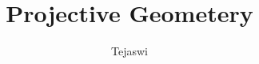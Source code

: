 \documentclass[a4paper,12pt]{report}
\begin{document}
\title{Projective Geometery}
\author{Tejaswi}
\date{}
\maketitle


\tableofcontents
\newpage
{}


\end{document}
